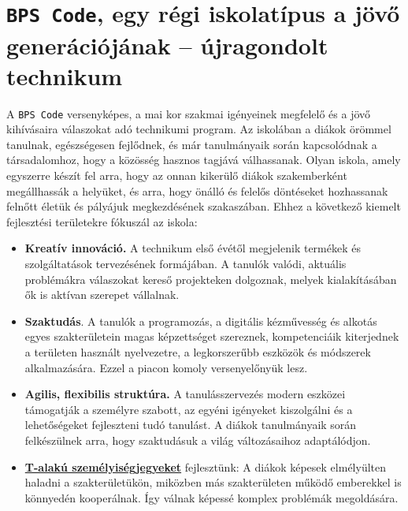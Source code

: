 \hypertarget{bps-code-egy-regi-iskolatipus-a-jovo-generaciojanak-ujragondolt-technikum}{%
\section{\texorpdfstring{\texttt{BPS\ Code}, egy régi iskolatípus a jövő
generációjának -- újragondolt
technikum}{BPS Code, egy régi iskolatípus a jövő generációjának -- újragondolt technikum}}\label{bps-code-egy-regi-iskolatipus-a-jovo-generaciojanak-ujragondolt-technikum}}

A \texttt{BPS\ Code} versenyképes, a mai kor szakmai igényeinek
megfelelő és a jövő kihívásaira válaszokat adó technikumi program. Az
iskolában a diákok örömmel tanulnak, egészségesen fejlődnek, és már
tanulmányaik során kapcsolódnak a társadalomhoz, hogy a közösség hasznos
tagjává válhassanak. Olyan iskola, amely egyszerre készít fel arra, hogy
az onnan kikerülő diákok szakemberként megállhassák a helyüket, és arra,
hogy önálló és felelős döntéseket hozhassanak felnőtt életük és pályájuk
megkezdésének szakaszában. Ehhez a következő kiemelt fejlesztési
területekre fókuszál az iskola:

\begin{itemize}
\item
  \textbf{Kreatív innováció.} A technikum első évétől megjelenik
  termékek és szolgáltatások tervezésének formájában. A tanulók valódi,
  aktuális problémákra válaszokat kereső projekteken dolgoznak, melyek
  kialakításában ők is aktívan szerepet vállalnak.
\item
  \textbf{Szaktudás}. A tanulók a programozás, a digitális kézművesség
  és alkotás egyes szakterületein magas képzettséget szereznek,
  kompetenciáik kiterjednek a területen használt nyelvezetre, a
  legkorszerűbb eszközök és módszerek alkalmazására. Ezzel a piacon
  komoly versenyelőnyük lesz.
\item
  \textbf{Agilis, flexibilis struktúra.} A tanulásszervezés modern
  eszközei támogatják a személyre szabott, az egyéni igényeket
  kiszolgálni és a lehetőségeket fejleszteni tudó tanulást. A diákok
  tanulmányaik során felkészülnek arra, hogy szaktudásuk a világ
  változásaihoz adaptálódjon.
\item
  \textbf{\href{https://en.wikipedia.org/wiki/T-shaped_skills}{T-alakú
  személyiségjegyeket}} fejlesztünk: A diákok képesek elmélyülten
  haladni a szakterületükön, miközben más szakterületen működő
  emberekkel is könnyedén kooperálnak. Így válnak képessé komplex
  problémák megoldására.
\end{itemize}

